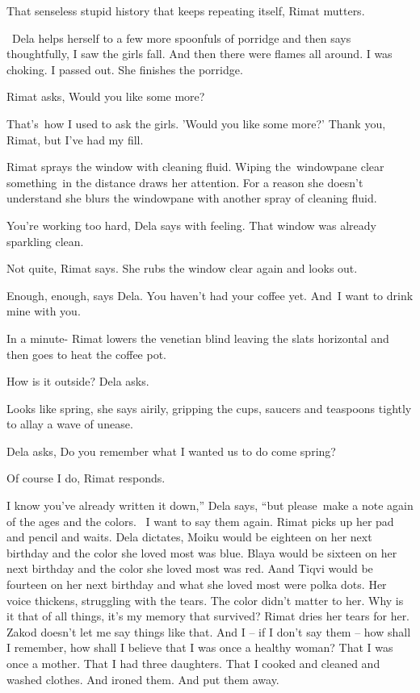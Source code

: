 \documentclass[twoside,11pt]{book}
\begin{document}
{\textquotedbl}That senseless stupid history that keeps repeating itself,{\textquotedbl} Rimat mutters.

~Dela helps herself to a few more spoonfuls of porridge and then says thoughtfully, {\textquotedbl}I saw the girls fall.
And then there were flames all around. I was choking. I passed out.{\textquotedbl} She finishes the porridge.

Rimat asks, {\textquotedbl}Would you like some more?{\textquotedbl} 

{\textquotedbl}That's~how I used to ask the girls. 'Would you like some more?' Thank you, Rimat, but I've had my
fill.{\textquotedbl} 

Rimat sprays the window with cleaning fluid. Wiping the\ windowpane clear something{\ }in the distance
draws her attention. For a reason she doesn't understand she blurs the windowpane with another spray of cleaning fluid.


{\textquotedbl}You're working too hard,{\textquotedbl} Dela says with feeling. {\textquotedbl}That window was already
sparkling clean.{\textquotedbl} 

{\textquotedbl}Not quite,{\textquotedbl} Rimat says. She rubs the window clear again and looks out. 

{\textquotedbl}Enough, enough,{\textquotedbl} says Dela. {\textquotedbl}You haven't had your coffee yet.
And{\ }I want to drink mine with you.{\textquotedbl} 

{\textquotedbl}In a minute{}-{\textquotedbl} Rimat lowers the venetian blind leaving the slats horizontal and then goes
to heat the coffee pot.

{\textquotedbl}How is it outside?{\textquotedbl} Dela asks. 

{\textquotedbl}Looks like spring,{\textquotedbl} she says airily, gripping the cups, saucers and teaspoons tightly to
allay a wave of unease.

Dela asks, {\textquotedbl}Do you remember what I wanted us to do come spring?{\textquotedbl}

{\textquotedbl}Of course I do,{\textquotedbl} Rimat responds. 

{\textquotedbl}I know you've already written it down,'' Dela says, ``but please~make a note again of the ages and the
colors. ~I want to say them again.{\textquotedbl} Rimat picks up her pad and pencil and waits. Dela dictates,
{\textquotedbl}Moiku would be eighteen on her next birthday and the color she loved most was blue. Blaya would be
sixteen on her next birthday and the color she loved most was red. Aand Tiqvi would be fourteen on her next birthday
and what she loved most were polka dots.{\textquotedbl} Her voice thickens, struggling with the tears.
{\textquotedbl}The color didn't matter to her. Why is it that of all things, it's my memory that
survived?{\textquotedbl} Rimat dries her tears for her. {\textquotedbl}Zakod doesn't let me say things like that. And I
-- if I don't say them -- how shall I remember, how shall I believe that I was once a healthy woman? That I was once a
mother. That I had three daughters. That I cooked and cleaned and washed clothes. And ironed them. And put them
away.{\textquotedbl} 
\end{document}

